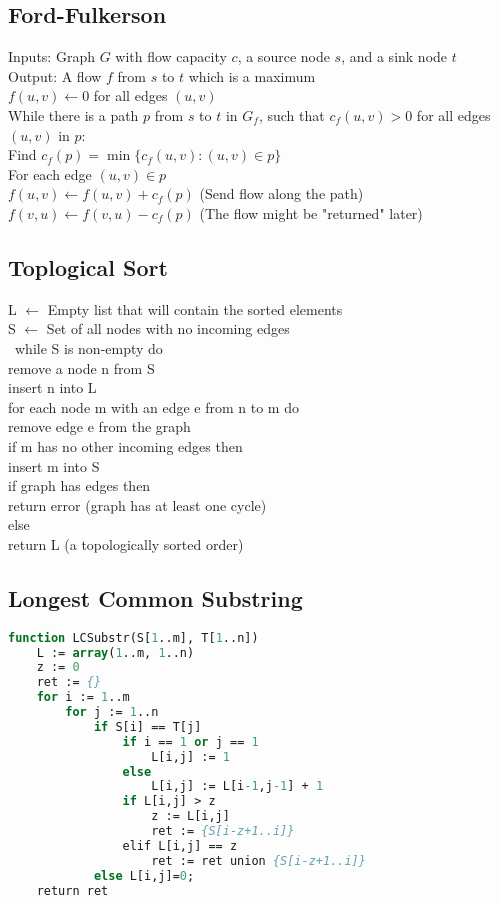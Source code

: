 \documentclass[10pt,a4paper]{article}
\begin{document}
\subsection*{Ford-Fulkerson}
Inputs: Graph $G$ with flow capacity $c$, a source node $s$, and a sink node $t$ \\
Output: A flow $f$ from $s$ to $t$ which is a maximum \\
$f(u,v) \leftarrow 0$ for all edges $(u,v)$\\
While there is a path $p$ from $s$ to $t$ in $G_f$, such that $c_f(u,v) > 0$ for all edges $(u,v)$ in $p$:\\
\indent Find $c_f(p) = \min\{c_f(u,v) : (u,v) \in p\}$\\
\indent For each edge $(u,v) \in p$\\
\indent\indent  $f(u,v) \leftarrow f(u,v) + c_f(p)$ (Send flow along the path)\\
\indent\indent  $f(v,u) \leftarrow f(v,u) - c_f(p)$ (The flow might be "returned" later)


\subsection*{Toplogical Sort}
L $\leftarrow$ Empty list that will contain the sorted elements\\
S $\leftarrow$ Set of all nodes with no incoming edges\\\
while S is non-empty do\\
\indent remove a node n from S\\
\indent insert n into L\\
\indent for each node m with an edge e from n to m do\\
\indent\indent remove edge e from the graph\\
\indent\indent if m has no other incoming edges then\\
\indent\indent insert m into S\\
if graph has edges then\\
\indent return error (graph has at least one cycle)\\
else \\
\indent return L (a topologically sorted order)\\


\subsection*{Longest Common Substring}
\begin{lstlisting}[language=Pascal]
function LCSubstr(S[1..m], T[1..n])
    L := array(1..m, 1..n)
    z := 0
    ret := {}
    for i := 1..m
        for j := 1..n
            if S[i] == T[j]
                if i == 1 or j == 1
                    L[i,j] := 1
                else
                    L[i,j] := L[i-1,j-1] + 1
                if L[i,j] > z
                    z := L[i,j]
                    ret := {S[i-z+1..i]}
                elif L[i,j] == z
                    ret := ret union {S[i-z+1..i]}
            else L[i,j]=0;
    return ret
\end{lstlisting}
\end{document}
